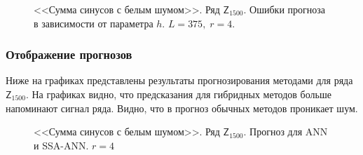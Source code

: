 \documentclass[specialist,
               substylefile = spbu.rtx,
               subf,href,colorlinks=true, 12p]{disser}
\begin{document}
\begin{figure}[H]
	\captionsetup{justification=centering}
	\caption{<<Сумма синусов с белым шумом>>. Ряд $\mathsf{Z}_{1500}$. Ошибки прогноза в зависимости от параметра $h$. $L = 375, \; r = 4$.}
	\label{edsinlen_r4.h}
\end{figure}

\subsubsection{Отображение прогнозов}

Ниже на графиках представлены результаты прогнозирования методами для ряда $\mathsf{Z}_{1500}$. На графиках видно, что предсказания для гибридных методов больше напоминают сигнал ряда. Видно, что в прогноз обычных методов проникает шум.

\begin{figure}[H]
	\captionsetup{justification=centering}
	\caption{<<Сумма синусов с белым шумом>>. Ряд $\mathsf{Z}_{1500}$. Прогноз для ANN и SSA-ANN. $r = 4$}
	\label{edsinlen_r4_res_ann}
\end{figure}
\end{document}
